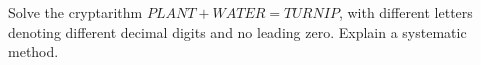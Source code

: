 Solve the cryptarithm $PLANT+WATER=TURNIP$, with different letters denoting different decimal digits and no leading zero. Explain a systematic method.
